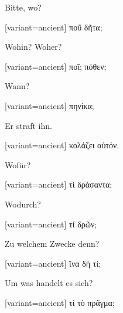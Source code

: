 Bitte, wo?

\switchcolumn

\begin{greek}[variant=ancient]%
ποῦ δῆτα;

\end{greek}%
\switchcolumn*

Wohin? Woher?

\switchcolumn

\begin{greek}[variant=ancient]%
ποῖ; πόθεν;

\end{greek}%
\switchcolumn*

Wann?

\switchcolumn

\begin{greek}[variant=ancient]%
πηνίκα;

\end{greek}%
\switchcolumn*

Er straft ihn.

\switchcolumn

\begin{greek}[variant=ancient]%
κολάζει αὐτόν.

\end{greek}%
\switchcolumn*

Wofür?

\switchcolumn

\begin{greek}[variant=ancient]%
τί δράσαντα;

\end{greek}%
\switchcolumn*

Wodurch?

\switchcolumn

\begin{greek}[variant=ancient]%
τί δρῶν;

\end{greek}%
\switchcolumn*

Zu welchem Zwecke denn?

\switchcolumn

\begin{greek}[variant=ancient]%
ἵνα δὴ τί;

\end{greek}%
\switchcolumn*

Um was handelt es sich?

\switchcolumn

\begin{greek}[variant=ancient]%
τί τὸ πρᾶγμα;

\end{greek}%
\switchcolumn*

